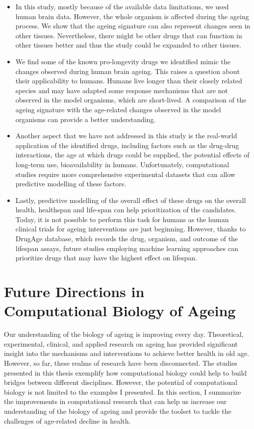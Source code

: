 \documentclass[12pt,twoside]{unicam}
\providecommand{\tightlist}{%
  \setlength{\itemsep}{0pt}\setlength{\parskip}{0pt}}
\begin{document}
\begin{itemize}
\tightlist
\item
  In this study, mostly because of the available data limitations, we used human brain data. However, the whole organism is affected during the ageing process. We show that the ageing signature can also represent changes seen in other tissues. Nevertheless, there might be other drugs that can function in other tissues better and thus the study could be expanded to other tissues.
\item
  We find some of the known pro-longevity drugs we identified mimic the changes observed during human brain ageing. This raises a question about their applicability to humans. Humans live longer than their closely related species and may have adapted some response mechanisms that are not observed in the model organisms, which are short-lived. A comparison of the ageing signature with the age-related changes observed in the model organisms can provide a better understanding.
\item
  Another aspect that we have not addressed in this study is the real-world application of the identified drugs, including factors such as the drug-drug interactions, the age at which drugs could be supplied, the potential effects of long-term use, bioavailability in humans. Unfortunately, computational studies require more comprehensive experimental datasets that can allow predictive modelling of these factors.
\item
  Lastly, predictive modelling of the overall effect of these drugs on the overall health, healthspan and life-span can help prioritization of the candidates. Today, it is not possible to perform this task for humans as the human clinical trials for ageing interventions are just beginning. However, thanks to DrugAge database, which records the drug, organism, and outcome of the lifespan assays, future studies employing machine learning approaches can prioritize drugs that may have the highest effect on lifespan.
\end{itemize}

\hypertarget{future-directions-in-computational-biology-of-ageing}{%
\section{Future Directions in Computational Biology of Ageing}\label{future-directions-in-computational-biology-of-ageing}}

Our understanding of the biology of ageing is improving every day. Theoretical, experimental, clinical, and applied research on ageing has provided significant insight into the mechanisms and interventions to achieve better health in old age. However, so far, these realms of research have been disconnected. The studies presented in this thesis exemplify how computational biology could help to build bridges between different disciplines. However, the potential of computational biology is not limited to the examples I presented. In this section, I summarize the improvements in computational research that can help us increase our understanding of the biology of ageing and provide the toolset to tackle the challenges of age-related decline in health.
\end{document}
